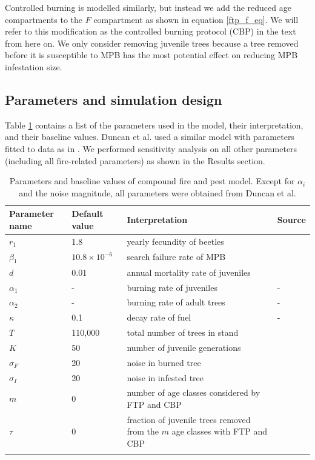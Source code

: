 Controlled burning is modelled similarly, but instead we add the reduced age compartments to the $F$ compartment as shown in equation \ref{ftp_f_eq}. We will refer to this modification as the controlled burning protocol (CBP) in the text from here on. We only consider removing juvenile trees because a tree removed before it is susceptible to MPB has the most potential effect on reducing MPB infestation size.

\subsection{Parameters and simulation design}

Table \ref{params} contains a list of the parameters used in the model, their interpretation, and their baseline values. Duncan et al. used a similar model with parameters fitted to data as in \cite{agne2016fire}. We performed sensitivity analysis on all other parameters (including all fire-related parameters) as shown in the Results section.

\begin{table}

\centering
\caption{Parameters and baseline values of compound fire and pest model. Except for $\alpha_i$ and the noise magnitude, all parameters were obtained from Duncan et al. \cite{duncan2015model}}

\begin{tabular}{l l p{5cm} l}
\hline\noalign{\smallskip}
  Parameter name & Default value & Interpretation & Source \\
\hline\noalign{\smallskip}
  $r_1$ & 1.8  & yearly fecundity of beetles & \cite{powell2009connecting}  \\
  $\beta_1$ & $10.8 \times 10^{-6}$  & search failure rate of MPB & \cite{powell2009connecting}   \\
  $d$ & 0.01  & annual mortality rate of juveniles & \cite{duncan2015model}  \\
  $\alpha_1$& - & burning rate of juveniles & - \\
  $\alpha_2$& - & burning rate of adult trees & - \\
  $\kappa$& 0.1 & decay rate of fuel & - \\
  $T$ & 110,000 & total number of trees in stand & \cite{powell2009connecting} \\
  $K$ & 50 & number of juvenile generations & \cite{duncan2015model} \\
  $\sigma_F$ & 20 & noise in burned tree\\
  $\sigma_I$ & 20 & noise in infested tree\\
  $m$ & 0 & number of age classes considered by FTP and CBP\\
  $\tau$ & 0 & fraction of juvenile trees removed from the $m$  age classes with FTP and CBP\\

\hline\noalign{\smallskip}
\end{tabular}
 \protect \label{params}
\end{table}
\normalsize


